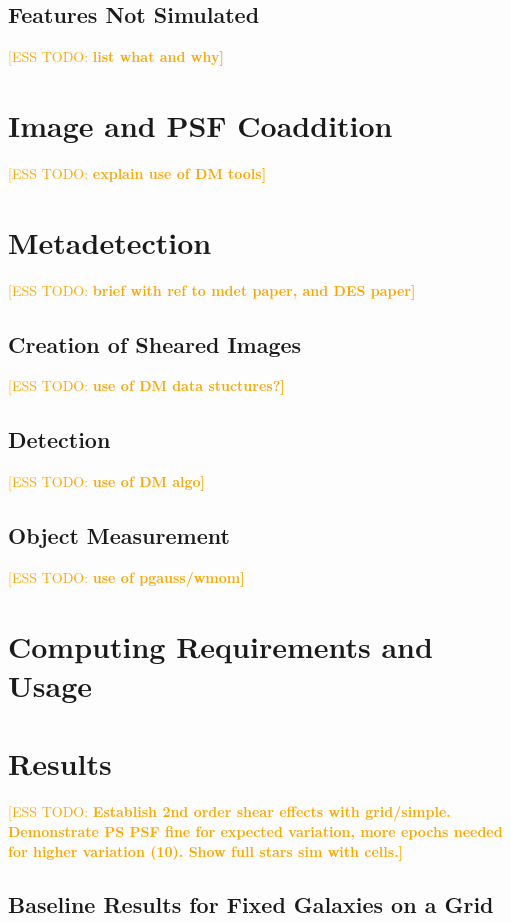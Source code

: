 \documentclass[iop, twocolappendix, appendixfloats, numberedappendix, apj]{hackemulateapj}
\newcommand{\esstodo}[1]{\textcolor{orange}{[ESS TODO: \bf #1]}}
\begin{document}
\subsection{Features Not Simulated} \label{sec:notincluded}
\esstodo{list what and why}

\section{Image and PSF Coaddition} \label{sec:coadding}
\esstodo{explain use of DM tools}

\section{Metadetection} \label{sec:mdet}
\esstodo{brief with ref to mdet paper, and DES paper}

\subsection{Creation of Sheared Images} \label{sec:mdet:sheared}
\esstodo{use of DM data stuctures?}
\subsection{Detection} \label{sec:mdet:detect}
\esstodo{use of DM algo}
\subsection{Object Measurement} \label{sec:mdet:meas}
\esstodo{use of pgauss/wmom}

\section{Computing Requirements and Usage} \label{sec:timing}

\section{Results} \label{sec:results}

\esstodo{Establish 2nd order shear effects with grid/simple.  Demonstrate PS PSF fine for expected variation, more epochs needed for higher variation (10). Show full stars sim with cells.}

\subsection{Baseline Results for Fixed Galaxies on a Grid} \label{sec:results:secondorder}
\end{document}
